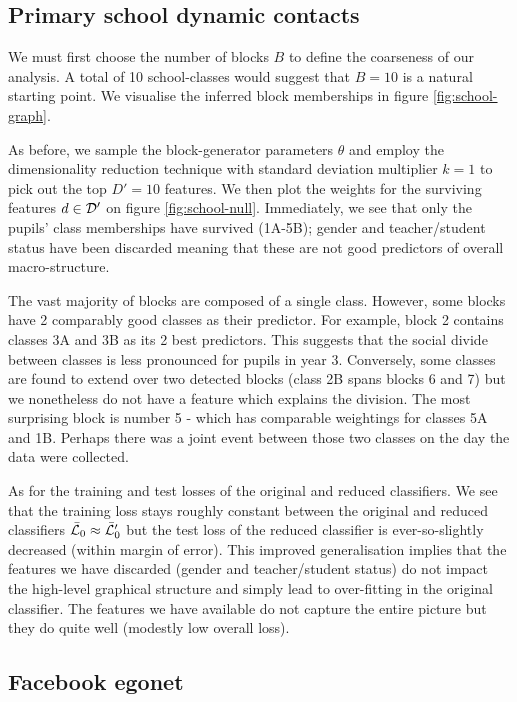 \subsection{Primary school dynamic contacts}

We must first choose the number of blocks $B$ to define the coarseness of our analysis. A total of 10 school-classes would suggest that $B=10$ is a natural starting point. We visualise the inferred block memberships in figure \ref{fig:school-graph}.

As before, we sample the block-generator parameters $\theta$ and employ the dimensionality reduction technique with standard deviation multiplier $k=1$ to pick out the top $D'=10$ features. We then plot the weights for the surviving features $d \in \mathcal{D}'$ on figure \ref{fig:school-null}. Immediately, we see that only the pupils' class memberships have survived (1A-5B); gender and teacher/student status have been discarded meaning that these are not good predictors of overall macro-structure.

The vast majority of blocks are composed of a single class. However, some blocks have 2 comparably good classes as their predictor. For example, block 2 contains classes 3A and 3B as its 2 best predictors. This suggests that the social divide between classes is less pronounced for pupils in year 3. Conversely, some classes are found to extend over two detected blocks (class 2B spans blocks 6 and 7) but we nonetheless do not have a feature which explains the division. The most surprising block is number 5 - which has comparable weightings for classes 5A and 1B. Perhaps there was a joint event between those two classes on the day the data were collected.

As for the training and test losses of the original and reduced classifiers. We see that the training loss stays roughly constant between the original and reduced classifiers $\bar{\mathcal{L}}_0 \approx \bar{\mathcal{L}}_0'$ but the test loss of the reduced classifier is ever-so-slightly decreased (within margin of error). This improved generalisation implies that the features we have discarded (gender and teacher/student status) do not impact the high-level graphical structure and simply lead to over-fitting in the original classifier. The features we have available do not capture the entire picture but they do quite well (modestly low overall loss).

\subsection{Facebook egonet}

